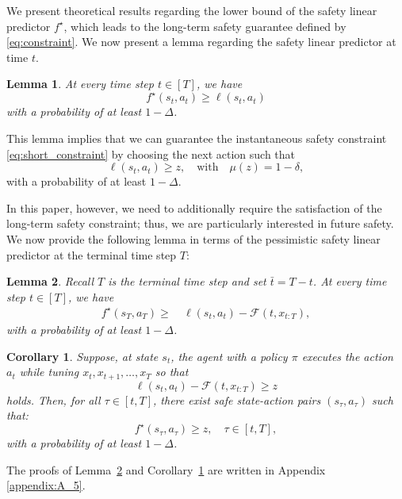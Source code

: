 \documentclass[letterpaper]{article} %
\newtheorem{lemma}
{Lemma}
\newtheorem{corollary}{Corollary}
\begin{document}
We present theoretical results regarding the lower bound of the safety linear predictor $f^\star$, which leads to the long-term safety guarantee defined by \eqref{eq:constraint}.
We now present a lemma regarding the safety linear predictor at time $t$.
%
\begin{lemma}
    \label{lemma:lower_bound}
    At every time step $t \in [T]$, we have
    \begin{equation}
        \label{eq:f_t}
        f^\star(s_t, a_t) \ge \ell(s_t, a_t)
    \end{equation}
    with a probability of at least $1-\Delta$.
\end{lemma}
%
\noindent
This lemma implies that we can guarantee the instantaneous safety constraint \eqref{eq:short_constraint} by choosing the next action such that 
%
\begin{equation}
    \ell(s_t, a_t) \ge z, \quad \text{with} \quad \mu(z) = 1 - \delta,
\end{equation}
%
with a probability of at least $1 - \Delta$.

In this paper, however, we need to additionally require the satisfaction of the long-term safety constraint; thus, we are particularly interested in future safety.
We now provide the following lemma in terms of the pessimistic safety linear predictor at the terminal time step $T$:
%
\begin{lemma}
    \label{lemma:f_ell_T}
    Recall $T$ is the terminal time step and set $\bar{t} = T - t$.
    At every time step $t \in [T]$, we have
    \begin{align*}
        \label{eq:f_t_T}
        f^\star(s_T, a_T)
        \ge &\ \ell(s_t, a_t) - \mathcal{F}(t, x_{t:T}),
    \end{align*}
    with a probability of at least $1-\Delta$.
\end{lemma}

\begin{corollary}
    \label{corollary:safety}
    Suppose, at state $s_t$, the agent with a policy $\pi$ executes the action $a_t$ while tuning $x_t, x_{t+1}, \ldots, x_T$ so that
    \begin{equation}
        \label{eq:condition_safety}
        \ell(s_t, a_t) - \mathcal{F}(t, x_{t:T}) \ge z
    \end{equation}
    holds.
    Then, for all $\tau \in [t, T]$, there exist safe state-action pairs $(s_\tau, a_\tau)$ such that: 
    \begin{equation}
        f^\star(s_\tau, a_\tau) \ge z, \quad \tau \in[t, T], 
    \end{equation}
    with a probability of at least $1 - \Delta$.
\end{corollary}
%
\noindent
The proofs of Lemma~\ref{lemma:f_ell_T} and Corollary~\ref{corollary:safety} are written in 
Appendix \ref{appendix:A_5}.
\end{document}
